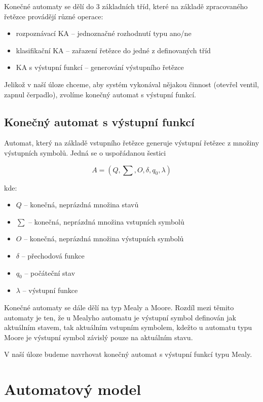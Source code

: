 \documentclass[12pt]{report}
\begin{document}
	Konečné automaty se dělí do 3 základních tříd, které na základě zpracovaného řetězce provádějí různé operace:
	\begin{itemize}
		\item rozpoznávací KA – jednoznačné rozhodnutí typu ano/ne
		\item klasifikační KA – zařazení řetězce do jedné z definovaných tříd
		\item KA s výstupní funkcí – generování výstupního řetězce
	\end{itemize}

	Jelikož v naší úloze chceme, aby systém vykonával nějakou činnost (otevřel ventil, zapnul čerpadlo), zvolíme konečný automat s výstupní funkcí.
			
	\section{Konečný automat s výstupní funkcí}
	Automat, který na základě vstupního řetězce generuje výstupní řetězec z množiny výstupních symbolů. Jedná se o uspořádanou šestici
	
	\begin{equation}
		A = (Q, \textstyle \sum, O, \delta, q_0, \lambda)
	\end{equation}

	kde:
	
	\begin{itemize}
		\item \texttt{$Q$} – konečná, neprázdná množina stavů
		\item \texttt{$\textstyle \sum$} – konečná, neprázdná množina vstupních symbolů
		\item \texttt{$O$} – konečná, neprázdná množina výstupních symbolů
		\item \texttt{$\delta$} – přechodová funkce
		\item \texttt{$q_0$} – počáteční stav
		\item \texttt{$\lambda$} – výstupní funkce
	\end{itemize}
	
	Konečné automaty se dále dělí na typ Mealy a Moore. Rozdíl mezi těmito automaty je ten, že u Mealyho automatu je výstupní symbol definován jak aktuálním stavem, tak aktuálním vstupním symbolem, kdežto u automatu typu Moore je výstupní symbol závislý pouze na aktuálním stavu.
	
	V naší úloze budeme navrhovat konečný automat s výstupní funkcí typu Mealy.
	
	\chapter{Automatový model}
	
\end{document}
